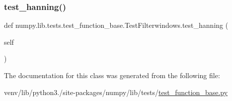 \subsubsection{\texorpdfstring{test\+\_\+hanning()}{test\_hanning()}}
{\footnotesize\ttfamily def numpy.\+lib.\+tests.\+test\+\_\+function\+\_\+base.\+Test\+Filterwindows.\+test\+\_\+hanning (\begin{DoxyParamCaption}\item[{}]{self }\end{DoxyParamCaption})}



The documentation for this class was generated from the following file\+:\begin{DoxyCompactItemize}
\item 
venv/lib/python3./site-\/packages/numpy/lib/tests/\hyperlink{lib_2tests_2test__function__base_8py}{test\+\_\+function\+\_\+base.\+py}\end{DoxyCompactItemize}
